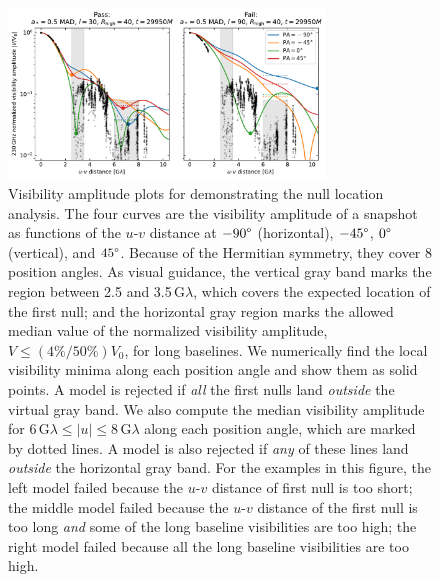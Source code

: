 \begin{figure}
  \centering
  \includegraphics[width=0.75\textwidth]{figures/passfail_va.pdf}
  \caption{
    Visibility amplitude plots for demonstrating the null
    location analysis.
    The four curves are the visibility amplitude of a snapshot as
    functions of the $u$-$v$ distance at $-90\degree$ (horizontal),
    $-45\degree$, $0\degree$ (vertical), and $45\degree$.
    Because of the Hermitian symmetry, they cover 8 position angles.
    As visual guidance, the vertical gray band marks the region
    between 2.5 and 3.5\,$\mathrm{G}\lambda$, which covers the
    expected location of the first null; and the horizontal gray region
    marks the allowed median value of the normalized visibility
    amplitude, $V \leq (4\%/50\%) V_0$, for long baselines.
    We numerically find the local visibility minima along each
    position angle and show them as solid points.
    A model is rejected if \emph{all} the first nulls land
    \emph{outside} the virtual gray band.
    We also compute the median visibility amplitude for
    $6\,\mathrm{G}\lambda \leq |u| \leq 8\,\mathrm{G}\lambda$ along
    each position angle, which are marked by dotted lines.
    A model is also rejected if \emph{any} of these lines land
    \emph{outside} the horizontal gray band.
    For the examples in this figure, the left model failed because the
    $u$-$v$ distance of first null is too short; the middle model failed
    because the $u$-$v$ distance of the first null is too long
    \emph{and} some of the long baseline visibilities are too high;
    the right model failed because all the long baseline visibilities
    are too high.
    }
  \label{fig:passfail_va}
\end{figure}

